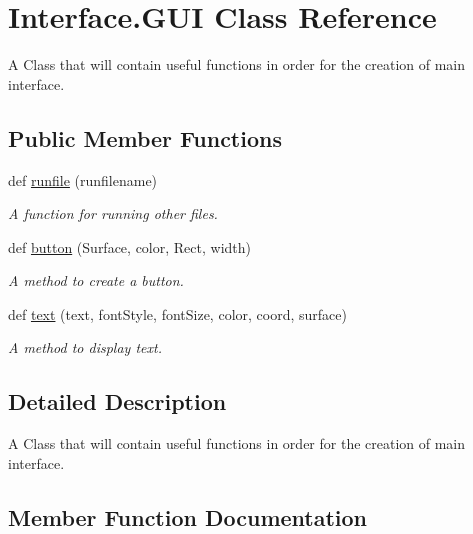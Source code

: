 \hypertarget{classInterface_1_1GUI}{}\section{Interface.\+G\+UI Class Reference}
\label{classInterface_1_1GUI}


A Class that will contain useful functions in order for the creation of main interface.  


\subsection*{Public Member Functions}
\begin{DoxyCompactItemize}
\item 
def \hyperlink{classInterface_1_1GUI_aea50c45b0173d626777b9aee47a23591}{runfile} (runfilename)
\begin{DoxyCompactList}\small\item\em A function for running other files. \end{DoxyCompactList}\item 
def \hyperlink{classInterface_1_1GUI_a6e96c109143b0d74c039338673435280}{button} (Surface, color, Rect, width)
\begin{DoxyCompactList}\small\item\em A method to create a button. \end{DoxyCompactList}\item 
def \hyperlink{classInterface_1_1GUI_a1017c12e07fbe580fa27aa4c0c634b93}{text} (text, font\+Style, font\+Size, color, coord, surface)
\begin{DoxyCompactList}\small\item\em A method to display text. \end{DoxyCompactList}\end{DoxyCompactItemize}


\subsection{Detailed Description}
A Class that will contain useful functions in order for the creation of main interface. 

\subsection{Member Function Documentation}
